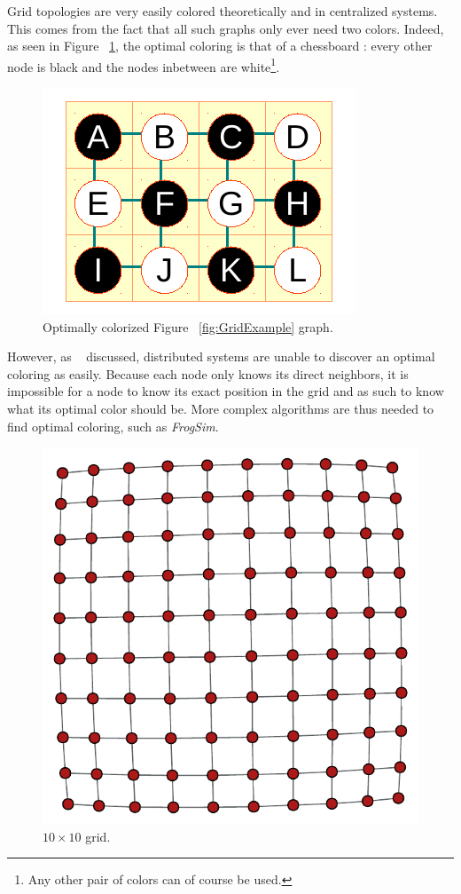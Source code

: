 \documentclass[letterpaper]{article}
\begin{document}
Grid topologies are very easily colored theoretically and in centralized systems. This comes from the fact that all such graphs only ever need two colors. Indeed, as seen in Figure ~\ref{fig:GridExampleColored}, the optimal coloring is that of a chessboard : every other node is black and the nodes inbetween are white\footnote{Any other pair of colors can of course be used.}.

\begin{figure}[h]
\centering
\includegraphics[]{./Figures/GridTopologyExampleColored.pdf}
\caption{Optimally colorized Figure ~\ref{fig:GridExample} graph.} \label{fig:GridExampleColored}
\end{figure}

However, as ~\cite{HB10} discussed, distributed systems are unable to discover an optimal coloring as easily. Because each node only knows its direct neighbors, it is impossible for a node to know its exact position in the grid and as such to know what its optimal color should be. More complex algorithms are thus needed to find optimal coloring, such as \emph{FrogSim}.

\begin{figure}[h]
\centering
\includegraphics[scale=0.5]{./Figures/grid.pdf}
\caption{$10 \times 10$ grid.} \label{fig:GridInstance}
\end{figure}
\end{document}
